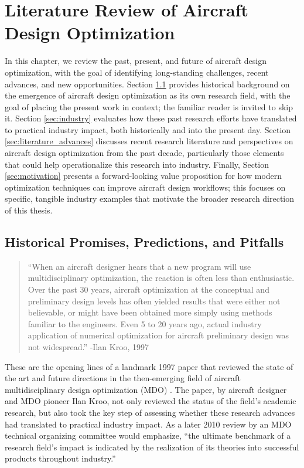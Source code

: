 \chapter{Literature Review of Aircraft Design Optimization}
\label{chap:literature}

In this chapter, we review the past, present, and future of aircraft design optimization, with the goal of identifying long-standing challenges, recent advances, and new opportunities. Section \ref{sec:history} provides historical background on the emergence of aircraft design optimization as its own research field, with the goal of placing the present work in context; the familiar reader is invited to skip it. Section \ref{sec:industry} evaluates how these past research efforts have translated to practical industry impact, both historically and into the present day. Section \ref{sec:literature_advances} discusses recent research literature and perspectives on aircraft design optimization from the past decade, particularly those elements that could help operationalize this research into industry. Finally, Section \ref{sec:motivation} presents a forward-looking value proposition for how modern optimization techniques can improve aircraft design workflows; this focuses on specific, tangible industry examples that motivate the broader research direction of this thesis.


\section{Historical Promises, Predictions, and Pitfalls}
\label{sec:history}

\begin{quote}
    ``When an aircraft designer hears that a new program will use multidisciplinary optimization, the reaction is often less than enthusiastic. Over the past 30 years, aircraft optimization at the conceptual and preliminary design levels has often yielded results that were either not believable, or might have been obtained more simply using methods familiar to the engineers. Even 5 to 20 years ago, actual industry application of numerical optimization for aircraft preliminary design was not widespread.''
    \flushright-Ilan Kroo, 1997 \cite{kroo_multidisciplinary_1997}
\end{quote}

These are the opening lines of a landmark 1997 paper that reviewed the state of the art and future directions in the then-emerging field of aircraft multidisciplinary design optimization (MDO) \cite{kroo_multidisciplinary_1997}. The paper, by aircraft designer and MDO pioneer Ilan Kroo, not only reviewed the status of the field's academic research, but also took the key step of assessing whether these research advances had translated to practical industry impact. As a later 2010 review by an MDO technical organizing committee would emphasize, ``the ultimate benchmark of a research field's impact is indicated by the realization of its theories into successful products throughout industry.'' \cite{agte_mdo_2010}

